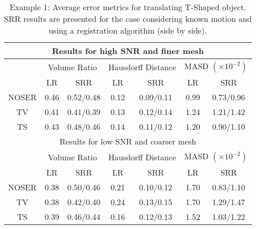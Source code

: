 \documentclass[10pt]{IEEEtran}
\begin{document}
\renewcommand{\arraystretch}{1.3}
\begin{table}
    \footnotesize
    \centering
    \begin{tabular}{|c|c|c|c|c|c|c|}
    \hline
    \multicolumn{7}{|c|}{Results for high SNR and finer mesh} \\ \hline
    &\multicolumn{2}{|c|}{Volume Ratio}& \multicolumn{2}{|c|}{Hausdorff Distance} & \multicolumn{2}{|c|}{MASD $(\times10^{-2})$} \\ \hline
       & LR & SRR & LR & SRR & LR & SRR \\ \hline
    NOSER & 0.46 & 0.52/0.48 & 0.12 & 0.09/0.11 & 0.99 & 0.73/0.96 \\ \hline
    TV    & 0.41 & 0.41/0.39 & 0.13 & 0.12/0.14 & 1.24 & 1.21/1.42 \\ \hline
    TS    & 0.43 & 0.48/0.46 & 0.14 & 0.11/0.12 & 1.20 & 0.90/1.10 \\ \hline
    \multicolumn{7}{|c|}{Results for low SNR and coarser mesh} \\ \hline
    &\multicolumn{2}{|c|}{Volume Ratio}& \multicolumn{2}{|c|}{Hausdorff Distance} & \multicolumn{2}{|c|}{MASD $(\times10^{-2})$} \\ \hline
       & LR & SRR & LR & SRR & LR & SRR \\ \hline
    NOSER & 0.38 & 0.50/0.46 & 0.21 & 0.10/0.12 & 1.70 & 0.83/1.10 \\ \hline
    TV    & 0.38 & 0.42/0.40 & 0.24 & 0.13/0.15 & 1.70 & 1.29/1.47 \\ \hline
    TS    & 0.39 & 0.46/0.44 & 0.16 & 0.12/0.13 & 1.52 & 1.03/1.22 \\ \hline
    \end{tabular}
    \vspace{0.25cm}
    \caption{Example 1: Average error metrics for translating T-Shaped object. SRR results are presented for the case considering known motion and using a registration algorithm (side by side).}
    \label{ref:tab_ex1_quant}
\end{table}
\end{document}
